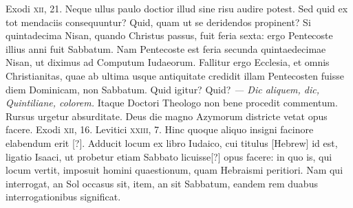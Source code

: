 Exodi \textsc{xii}, 21.
Neque ullus paulo doctior illud sine risu audire potest.
Sed quid ex tot mendaciis consequuntur?
Quid, quam ut se deridendos propinent?
Si quintadecima Nisan, quando Christus passus, fuit feria sexta: ergo Pentecoste
illius anni fuit Sabbatum.
Nam Pentecoste est feria secunda
quintaedecimae Nisan, ut diximus ad Computum Iudaeorum.
Fallitur ergo Ecclesia, et omnis Christianitas, quae ab ultima usque
 antiquitate
credidit illam Pentecosten fuisse diem Dominicam, non
Sabbatum.
Quid igitur?
Quid?
\textit{— Dic aliquem, dic, Quintiliane, colorem.}
Itaque Doctori Theologo non bene procedit commentum.
Rursus urgetur absurditate.
Deus die magno Azymorum districte
vetat opus facere.
Exodi \textsc{xii}, 16.
Levitici \textsc{xxiii}, 7.
Hinc quoque
aliquo insigni facinore elabendum erit [?].
Adducit locum ex libro Iudaico,
cui titulus \texthebrew{[Hebrew]} id est, ligatio Isaaci, ut probetur etiam
Sabbato licuisse[?] opus facere: in quo is, qui locum vertit, imposuit homini
quaestionum, quam Hebraismi peritiori.
{}
Nam qui interrogat,
an Sol occasus sit, item, an sit Sabbatum, eandem rem duabus interrogationibus
significat.

